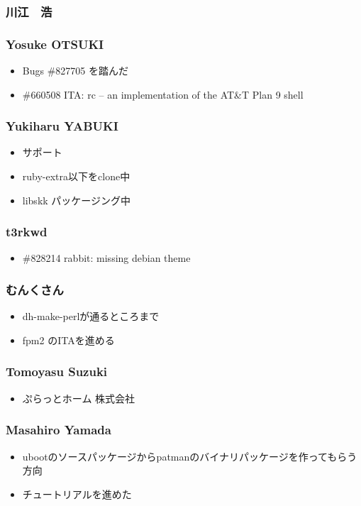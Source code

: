 \documentclass[cjk,dvipdfmx,10pt,compress,%
hyperref={bookmarks=true,bookmarksnumbered=true,bookmarksopen=false,%
colorlinks=false,%
pdftitle={第 111 回 関西 Debian 勉強会},%
pdfauthor={倉敷・のがた・佐々木・かわだ},%
pdfsubject={資料},%
}]{beamer}
\begin{document}
\begin{frame}
  \frametitle{ 川江　浩 }
\end{frame}

\begin{frame}
  \frametitle{ Yosuke OTSUKI }
  \begin{itemize}
  \item Bugs \#827705 を踏んだ
  \item \#660508 ITA: rc -- an implementation of the AT\&T Plan 9 shell
  \end{itemize}
\end{frame}



\begin{frame}
  \frametitle{ Yukiharu YABUKI }
  \begin{itemize}
  \item サポート
  \item ruby-extra以下をclone中
  \item libskk パッケージング中
  \end{itemize}
\end{frame}

\begin{frame}
  \frametitle{ t3rkwd }
  \begin{itemize}
  \item \#828214 rabbit: missing debian theme
  \end{itemize}
\end{frame}

\begin{frame}
  \frametitle{ むんくさん }
  \begin{itemize}
  \item dh-make-perlが通るところまで
  \item fpm2 のITAを進める
  \end{itemize}
\end{frame}

\begin{frame}
  \frametitle{ Tomoyasu Suzuki }
  \begin{itemize}
  \item ぷらっとホーム 株式会社
  \end{itemize}
\end{frame}

\begin{frame}
  \frametitle{ Masahiro Yamada }
  \begin{itemize}
  \item ubootのソースパッケージからpatmanのバイナリパッケージを作ってもらう方向
  \item チュートリアルを進めた
  \end{itemize}
\end{frame}
\end{document}
